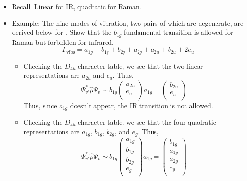\documentclass[../notes.tex]{subfiles}
\begin{document}
\begin{itemize}
    \item Recall: Linear for IR, quadratic for Raman.
    \item Example: The nine modes of vibration, two pairs of which are degenerate, are derived below for . Show that the $b_{1g}$ fundamental transition is allowed for Raman but forbidden for infrared.
    \begin{equation*}
        \Gamma_\text{vibs} = a_{1g}+b_{1g}+b_{2g}+a_{2g}+a_{2u}+b_{2u}+2e_u
    \end{equation*}
    \begin{itemize}
        \item Checking the $D_{4h}$ character table, we see that the two linear representations are $a_{2u}$ and $e_u$. Thus,
        \begin{equation*}
            \Psi^*_{v'}\hat{\mu}\Psi_v \sim b_{1g}
            \begin{pmatrix}
                a_{2u}\\
                e_u\\
            \end{pmatrix}
            a_{1g} =
            \begin{pmatrix}
                b_{2u}\\
                e_u\\
            \end{pmatrix}
        \end{equation*}
        Thus, since $a_{1g}$ doesn't appear, the IR transition is not allowed.
        \item Checking the $D_{4h}$ character table, we see that the four quadratic representations are $a_{1g}$, $b_{1g}$, $b_{2g}$, and $e_g$. Thus,
        \begin{equation*}
            \Psi^*_{v'}\hat{\mu}\Psi_v \sim b_{1g}
            \begin{pmatrix}
                a_{1g}\\
                b_{1g}\\
                b_{2g}\\
                e_g\\
            \end{pmatrix}
            a_{1g} =
            \begin{pmatrix}
                b_{1g}\\
                a_{1g}\\
                a_{2g}\\
                e_g\\

\end{pmatrix}
\end{equation*}
\end{itemize}
\end{itemize}
\end{document}
